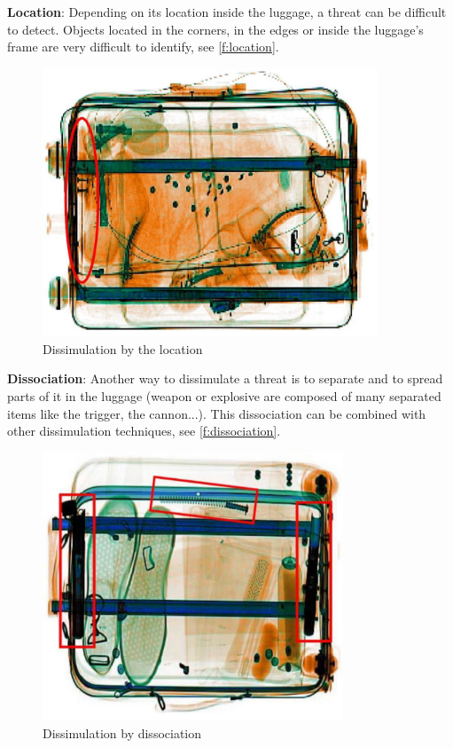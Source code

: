 \textbf{Location}: Depending on its location inside the luggage, a threat can be difficult to detect. Objects located in the corners, in the edges or inside the luggage's frame are very difficult to identify,  see  \autoref{f:location}.
\begin{figure}
\centering
	\includegraphics[height=8cm]{Figures/positioning}
	\caption{Dissimulation by the location}
	\label{f:location}
\end{figure}

\textbf{Dissociation}: Another way to dissimulate a threat is to separate and to spread parts of it in the luggage (weapon or explosive are composed of many separated items like the trigger, the cannon...). This dissociation can be combined with other dissimulation techniques,  see  \autoref{f:dissociation}.
\begin{figure}
\centering
	\includegraphics[height=8cm]{Figures/Dissociation}
	\caption{Dissimulation by dissociation}
	\label{f:dissociation}
\end{figure}

